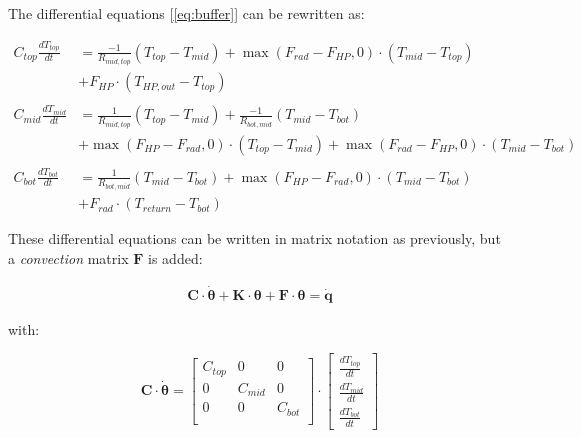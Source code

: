 The differential equations [\ref{eq:buffer}] can be rewritten as:

{\color{teal}
	\begin{equation}
		\begin{aligned}
			C_{top}\frac{dT_{top}}{dt} &= \frac{-1}{R_{mid, top}} (T_{top}-T_{mid}) + \max(F_{rad}-F_{HP}, 0) \cdot (T_{mid} - T_{top}) \\
			&+ F_{HP} \cdot (T_{HP,out} - T_{top})
			\\ \\
			C_{mid}\frac{dT_{mid}}{dt} &= \frac{1}{R_{mid, top}} (T_{top}-T_{mid}) + \frac{-1}{R_{bot, mid}}(T_{mid}-T_{bot}) \\
			& + \max(F_{HP}-F_{rad}, 0) \cdot (T_{top} - T_{mid}) + \max(F_{rad}-F_{HP}, 0)  \cdot (T_{mid} - T_{bot}) 
			\\ \\
			C_{bot}\frac{dT_{bot}}{dt} &= \frac{1}{R_{bot, mid}} (T_{mid}-T_{bot}) + \max(F_{HP} - F_{rad}, 0) \cdot (T_{mid} - T_{bot})\\
			& + F_{rad} \cdot (T_{return} - T_{bot}) 
		\end{aligned}
	\end{equation}
}

These differential equations can be written in matrix notation as previously, but a \emph{convection} matrix $\mathbf{F}$ is added:

\begin{subequations}
	\label{eq:matnot}
	\begin{align}
		\mathbf{C} \cdot \boldsymbol{\dot{\theta}} + \mathbf{K} \cdot \boldsymbol{\theta} + \mathbf{F} \cdot \boldsymbol{\theta}= \mathbf{\dot{q}}
	\end{align}
\end{subequations}

with:

\begin{equation}
	\mathbf{C} \cdot \boldsymbol{\dot{\theta}} =
	\begin{bmatrix}
		C_{top} & 0 & 0 \\
		0 &  C_{mid} & 0 \\
		0 & 0 & C_{bot} \\
	\end{bmatrix}
	\cdot
	\begin{bmatrix}
		\frac{dT_{top}}{dt} \\
		\frac{dT_{mid}}{dt} \\
		\frac{dT_{bot}}{dt}
	\end{bmatrix}
\end{equation}

